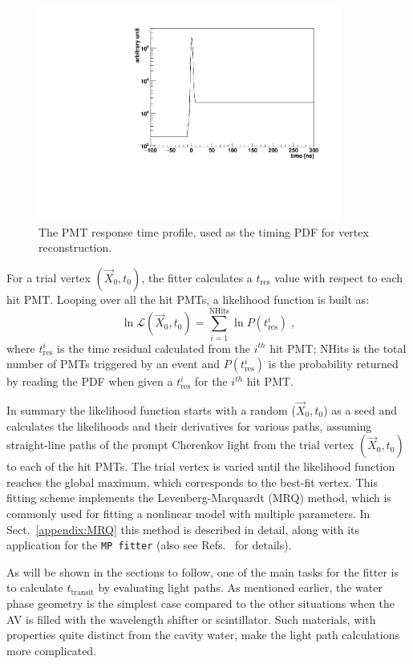 \begin{figure}[!htb]
	\centering
	\includegraphics[width=10cm]{MPW_timingPDF.pdf}
	\caption{The PMT response time profile, used as the timing PDF for vertex reconstruction.}
	\label{fig:MPW_timingPDF}
\end{figure}

For a trial vertex $(\vec{X}_0,t_0)$, the fitter calculates a $t_{\mathrm{res}}$ value with respect to each hit PMT. Looping over all the hit PMTs, a likelihood function is built as:
\begin{equation}\label{eq:vertexLogL}
\ln\mathcal{L}(\vec{X}_0,t_0)=\sum_{i=1}^{{\mathrm{NHits}}}\ln P(t^i_{\mathrm{res}})\;,
\end{equation}
where $t^i_{\mathrm{res}}$ is the time residual calculated from the $i^{th}$ hit PMT; NHits is the total number of PMTs triggered by an event and $P(t^i_{\mathrm{res}})$ is the probability returned by reading the PDF when given a $t^i_{\mathrm{res}}$ for the $i^{th}$ hit PMT.

In summary the likelihood function starts with a random ($\vec{X}_0,t_0$) as a seed and calculates the likelihoods and their derivatives for various paths, assuming straight-line paths of the prompt Cherenkov light from the trial vertex $(\vec{X}_0,t_0)$ to each of the hit PMTs. The trial vertex is varied until the likelihood function reaches the global maximum, which corresponds to the best-fit vertex. This fitting scheme implements the Levenberg-Marquardt (MRQ) method, which is commonly used for fitting a nonlinear model with multiple parameters. In Sect.~\ref{appendix:MRQ} this method is described in detail, along with its application for the \texttt{MP fitter} (also see Refs.~\cite{gregory2005bayesian, press2007numerical} for details).

As will be shown in the sections to follow, one of the main tasks for the fitter is to calculate $t_{\mathrm{transit}}$ by evaluating light paths. As mentioned earlier, the water phase geometry is the simplest case compared to the other situations when the AV is filled with the wavelength shifter or scintillator. Such materials, with properties quite distinct from the cavity water, make the light path calculations more complicated.

